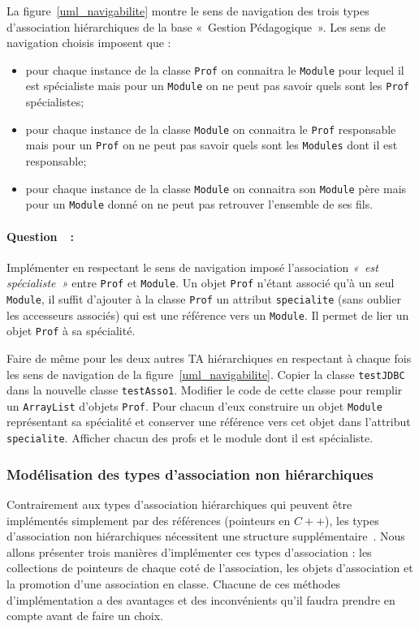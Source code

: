 \documentclass[a4paper,11pt]{article}
\newcounter{compteurQuestion}
\newcommand{\Question}{\paragraph*{Question~\thecompteurQuestion~:}\addtocounter{compteurQuestion}{1}}
\begin{document}
La figure~\ref{uml_navigabilite} montre le sens de navigation des trois types d'association 
hiérarchiques de la base «~Gestion Pédagogique~». Les sens de navigation choisis imposent que :  
\begin{itemize}
	\item pour chaque instance de la classe \texttt{Prof} 
  on connaitra le \texttt{Module} pour lequel il est spécialiste mais pour un \texttt{Module} on ne 
  peut pas savoir quels sont les \texttt{Prof} spécialistes;
  \item pour chaque instance de la classe \texttt{Module} 
  on connaitra le \texttt{Prof} responsable mais pour un \texttt{Prof} on ne 
  peut pas savoir quels sont les \texttt{Modules} dont il est responsable;
  \item pour chaque instance de la classe \texttt{Module} 
  on connaitra son \texttt{Module} père mais pour un \texttt{Module} donné on ne peut pas 
  retrouver l'ensemble de ses fils.
\end{itemize}

\Question Implémenter en respectant le sens de navigation imposé l'association 
\textit{«~est spécialiste~»} entre \texttt{Prof} et \texttt{Module}. 
Un objet \texttt{Prof} n'étant associé qu'à un seul \texttt{Module}, il suffit d'ajouter à 
la classe \texttt{Prof} un attribut \texttt{specialite} (sans oublier les accesseurs associés) qui est une référence vers un \texttt{Module}. 
Il permet de lier un objet \texttt{Prof} à sa spécialité.

Faire de même pour les deux autres TA hiérarchiques en respectant à chaque fois les sens de navigation de la
figure~\ref{uml_navigabilite}. Copier la classe \texttt{testJDBC} dans la nouvelle classe \texttt{testAsso1}. 
Modifier le code de cette classe pour remplir un \texttt{ArrayList} d'objets \texttt{Prof}. Pour chacun d'eux construire un objet
\texttt{Module} représentant sa spécialité et conserver une référence vers cet objet dans l'attribut
\texttt{specialite}. Afficher chacun des profs et le module dont il est spécialiste.


\subsubsection{Modélisation des types d'association non hiérarchiques}
Contrairement aux types d'association hiérarchiques qui peuvent être implémentés simplement par 
des références (pointeurs en $C++$), les types d'association non hiérarchiques nécessitent une 
structure supplémentaire~\citep{tse/Milicev2007,jot/Genova03,tse/Barbier2003}. Nous allons présenter trois manières d'implémenter ces 
types d'association : les collections de pointeurs de chaque coté de l'association, 
les objets d'association et la promotion d'une association en classe. Chacune de ces méthodes 
d'implémentation a des avantages et des inconvénients qu'il faudra prendre en compte avant 
de faire un choix.
\end{document}
